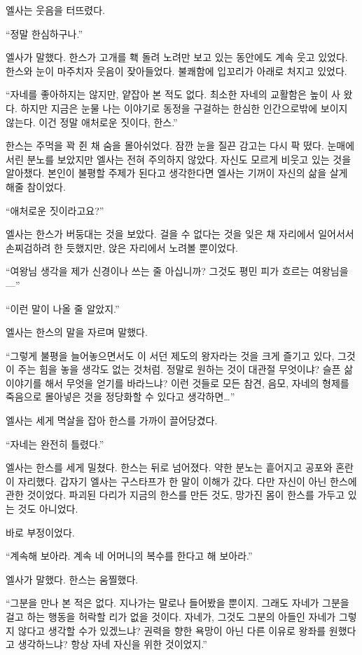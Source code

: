 엘사는 웃음을 터뜨렸다.

``정말 한심하구나.''

엘사가 말했다. 한스가 고개를 홱 돌려 노려만 보고 있는 동안에도 계속 웃고 있었다. 한스와 눈이 마주치자 웃음이 잦아들었다. 불쾌함에 입꼬리가 아래로 처지고 있었다.

``자네를 좋아하지는 않지만, 얕잡아 본 적도 없다. 최소한 자네의 교활함은 높이 사 왔다. 하지만 지금은 눈물 나는 이야기로 동정을 구걸하는 한심한 인간으로밖에 보이지 않는다. 이건 정말 애처로운 짓이다, 한스.''

한스는 주먹을 꽉 쥔 채 숨을 몰아쉬었다. 잠깐 눈을 질끈 감고는 다시 팍 떴다. 눈매에 서린 분노를 보았지만 엘사는 전혀 주의하지 않았다. 자신도 모르게 비웃고 있는 것을 알아챘다. 본인이 불평할 주제가 된다고 생각한다면 엘사는 기꺼이 자신의 삶을 살게 해줄 참이었다.

``애처로운 짓이라고요?''

엘사는 한스가 버둥대는 것을 보았다. 걸을 수 없다는 것을 잊은 채 자리에서 일어서서 손찌검하려 한 듯했지만, 앉은 자리에서 노려볼 뿐이었다.

``여왕님 생각을 제가 신경이나 쓰는 줄 아십니까? 그것도 평민 피가 흐르는 여왕님을—''

``이런 말이 나올 줄 알았지.''

엘사는 한스의 말을 자르며 말했다.

``그렇게 불평을 늘어놓으면서도 이 서던 제도의 왕자라는 것을 크게 즐기고 있다, 그것이 주는 힘을 놓을 생각도 없는 것처럼. 정말로 원하는 것이 대관절 무엇이냐? 슬픈 삶 이야기를 해서 무엇을 얻기를 바라느냐? 이런 것들로 모든 참견, 음모, 자네의 형제를 죽음으로 몰아넣은 것을 정당화할 수 있다고 생각하면\ldots''

엘사는 세게 멱살을 잡아 한스를 가까이 끌어당겼다.

``자네는 완전히 틀렸다.''

엘사는 한스를 세게 밀쳤다. 한스는 뒤로 넘어졌다. 약한 분노는 흩어지고 공포와 혼란이 자리했다. 갑자기 엘사는 구스타프가 한 말이 이해가 갔다. 다만 자신이 아닌 한스에 관한 것이었다. 파괴된 다리가 지금의 한스를 만든 것도, 망가진 몸이 한스를 가두고 있는 것도 아니었다.

바로 부정이었다.

``계속해 보아라. 계속 네 어머니의 복수를 한다고 해 보아라.''

엘사가 말했다. 한스는 움찔했다.

``그분을 만나 본 적은 없다. 지나가는 말로나 들어봤을 뿐이지. 그래도 자네가 그분을 걸고 하는 행동을 허락할 리가 없을 것이다. 자네가, 그것도 그분의 아들인 자네가 그렇지 않다고 생각할 수가 있겠느냐? 권력을 향한 욕망이 아닌 다른 이유로 왕좌를 원했다고 생각하느냐? 항상 자네 자신을 위한 것이었지.''

